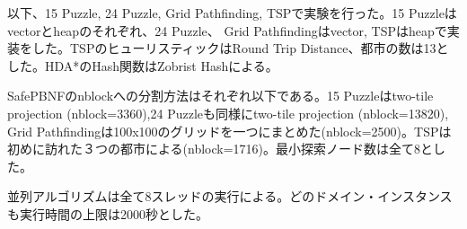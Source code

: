 \documentclass[uplatex]{jsarticle}
\begin{document}
以下、15 Puzzle, 24 Puzzle, Grid Pathfinding, TSPで実験を行った。15 Puzzleはvectorとheapのそれぞれ、24 Puzzle、 Grid Pathfindingはvector, TSPはheapで実装をした。TSPのヒューリスティックはRound Trip Distance、都市の数は13とした。HDA*のHash関数はZobrist Hashによる。


SafePBNFのnblockへの分割方法はそれぞれ以下である。15 Puzzleはtwo-tile projection (nblock=3360),24 Puzzleも同様にtwo-tile projection (nblock=13820), Grid Pathfindingは100x100のグリッドを一つにまとめた(nblock=2500)。TSPは初めに訪れた３つの都市による(nblock=1716)。最小探索ノード数は全て8とした。

並列アルゴリズムは全て8スレッドの実行による。どのドメイン・インスタンスも実行時間の上限は2000秒とした。
\newline
\end{document}
